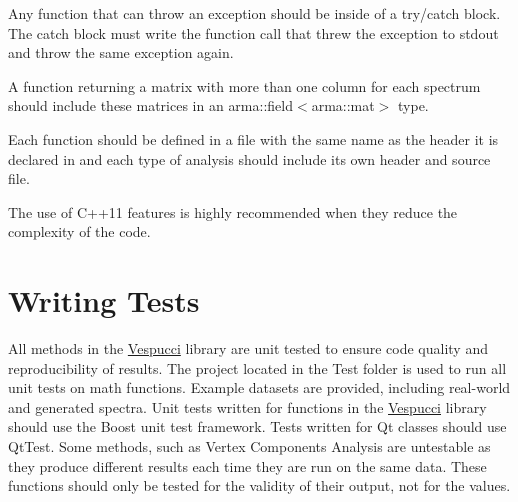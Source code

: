 \begin{DoxyItemize}
\item Any function that can throw an exception should be inside of a {\ttfamily try/catch} block. The {\ttfamily catch} block must write the function call that threw the exception to {\ttfamily stdout} and throw the same exception again.
\item A function returning a matrix with more than one column for each spectrum should include these matrices in an {\ttfamily arma\+::field$<$arma\+::mat$>$} type.
\item Each function should be defined in a file with the same name as the header it is declared in and each type of analysis should include its own header and source file.
\item The use of C++11 features is highly recommended when they reduce the complexity of the code.
\end{DoxyItemize}

\section*{Writing Tests }

All methods in the \hyperlink{namespace_vespucci}{Vespucci} library are unit tested to ensure code quality and reproducibility of results. The project located in the Test folder is used to run all unit tests on math functions. Example datasets are provided, including real-\/world and generated spectra. Unit tests written for functions in the \hyperlink{namespace_vespucci}{Vespucci} library should use the Boost unit test framework. Tests written for Qt classes should use Qt\+Test. Some methods, such as Vertex Components Analysis are untestable as they produce different results each time they are run on the same data. These functions should only be tested for the validity of their output, not for the values. 